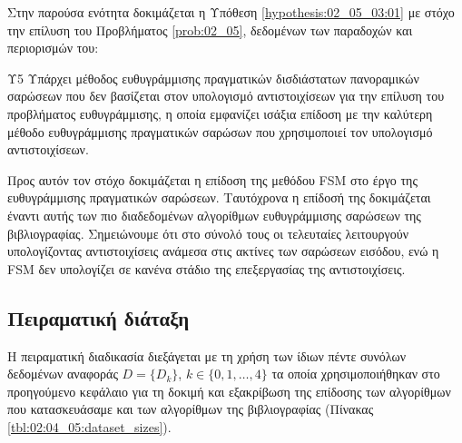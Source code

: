 Στην παρούσα ενότητα δοκιμάζεται η Υπόθεση \ref{hypothesis:02_05_03:01}
με στόχο την επίλυση του Προβλήματος \ref{prob:02_05}, δεδομένων των παραδοχών
και περιορισμών του:

\begin{customhypothesis}{Υ5}
  \label{hypothesis:02_05_03:01}
  Υπάρχει μέθοδος ευθυγράμμισης πραγματικών δισδιάστατων πανοραμικών σαρώσεων
  που δεν βασίζεται στον υπολογισμό αντιστοιχίσεων για την επίλυση του
  προβλήματος ευθυγράμμισης, η οποία εμφανίζει ισάξια επίδοση με την καλύτερη
  μέθοδο ευθυγράμμισης πραγματικών σαρώσων που χρησιμοποιεί τον υπολογισμό
  αντιστοιχίσεων.
\end{customhypothesis}

Προς αυτόν τον στόχο δοκιμάζεται η επίδοση της μεθόδου FSM στο έργο της
ευθυγράμμισης πραγματικών σαρώσεων. Ταυτόχρονα η επίδοσή της δοκιμάζεται έναντι
αυτής των πιο διαδεδομένων αλγορίθμων ευθυγράμμισης σαρώσεων της βιβλιογραφίας.
Σημειώνουμε ότι στο σύνολό τους οι τελευταίες λειτουργούν υπολογίζοντας
αντιστοιχίσεις ανάμεσα στις ακτίνες των σαρώσεων εισόδου, ενώ η FSM δεν
υπολογίζει σε κανένα στάδιο της επεξεργασίας της αντιστοιχίσεις.


\subsection{Πειραματική διάταξη}
\label{subsection:02_05_03:01}

Η πειραματική διαδικασία διεξάγεται με τη χρήση των ίδιων πέντε συνόλων
δεδομένων αναφοράς $D = \{D_k\}$, $k \in \{0,1,\dots,4\}$ τα οποία
χρησιμοποιήθηκαν στο προηγούμενο κεφάλαιο για τη δοκιμή και εξακρίβωση της
επίδοσης των αλγορίθμων που κατασκευάσαμε και των αλγορίθμων της βιβλιογραφίας
(Πίνακας \ref{tbl:02:04_05:dataset_sizes}).

